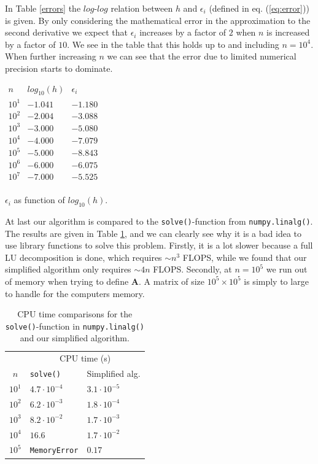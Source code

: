 \documentclass[12pt, a4paper]{article}
\begin{document}
In Table \ref{errors} the $log$-$log$ relation between $h$ and $\epsilon_i$ (defined in eq. 
(\ref{eq:error})) is given. By only considering the mathematical error in the approximation to the 
second derivative we expect that $\epsilon_i$ 
increases by a factor of $2$ when $n$ is increased by a factor of $10$. We see in the table that this 
holds up to and including $n=10^4$. When further increasing $n$ we can see that the error due to 
limited numerical precision starts to dominate. 

\begin{table}[ht!]
\begin{center}
$\begin{array}{c|c|c} 
n & log_{10}(h) & \epsilon_i \\ \hline 
10^1 & -1.041 & -1.180 \\ 
10^2 & -2.004 & -3.088 \\ 
10^3 & -3.000 & -5.080 \\  
10^4 & -4.000 & -7.079 \\ 
10^5 & -5.000 & -8.843 \\ 
10^6 & -6.000 & -6.075 \\ 
10^7 & -7.000 & -5.525 \\ 
\end{array}$
\end{center}
\caption{$\epsilon_i$ as function of $log_{10}(h)$.}
\label{errors}
\end{table}

At last our algorithm is compared to the \texttt{solve()}-function from \texttt{numpy.linalg()}. 
The results are given in Table \ref{CPU_1}, and we can clearly see why it is a bad idea to use 
library functions to solve this problem. Firstly, it is a lot slower because a full LU decomposition is 
done, which requires $\sim n^3$ FLOPS, while we found that our simplified algorithm only requires 
$\sim 4n$ FLOPS. Secondly, at $n=10^5$ we run out of memory when trying to define $\mathbf{A}$. A 
matrix of size $10^5 \times 10^5$ is simply to large to handle for the computers memory. 

\begin{table}[ht!]
\begin{center}
\begin{tabular}{c|l|l}
 & \multicolumn{2}{c}{CPU time (s)}  \\
$n$ & \texttt{solve()} & Simplified alg. \\ \hline 
$10^1$ & $4.7\cdot10^{-4}$ & $3.1\cdot10^{-5}$  \\
$10^2$ & $6.2\cdot10^{-3}$ & $1.8\cdot10^{-4}$\\
$10^3$ & $8.2\cdot10^{-2}$ & $1.7\cdot10^{-3}$ \\
$10^4$ & $16.6$ & $1.7\cdot10^{-2}$\\
$10^5$ & \texttt{MemoryError} & $0.17$ \\
\end{tabular}
\caption{CPU time comparisons for the \texttt{solve()}-function in \texttt{numpy.linalg()} and our 
simplified algorithm.}
\label{CPU_1}
\end{center}
\end{table}
\end{document}
